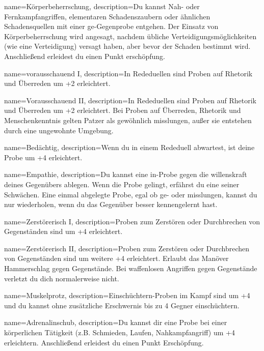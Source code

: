 {
    name={Körperbeherrschung},
    description={Du kannst Nah- oder Fernkampfangriffen, elementaren Schadenszaubern oder ähnlichen Schadensquellen mit einer \gls{ge}-Gegenprobe entgehen. Der Einsatz von Körperbeherrschung wird angesagt, nachdem übliche Verteidigungsmöglichkeiten (wie eine Verteidigung) versagt haben, aber bevor der Schaden bestimmt wird. Anschließend erleidest du einen Punkt \gls{erschöpfung}.}}

{
    name={vorausschauend I},
    description={In Rededuellen sind Proben auf Rhetorik und Überreden um +2 erleichtert.}}

{
    name={Vorausschauend II},
    description={In Rededuellen sind Proben auf Rhetorik und Überreden um +2 erleichtert. Bei Proben auf Überreden, Rhetorik und Menschenkenntnis gelten Patzer als gewöhnlich misslungen, außer sie entstehen durch eine ungewohnte Umgebung.}}

{
    name={Bedächtig},
    description={Wenn du in einem Rededuell abwartest, ist deine Probe um +4 erleichtert.}}

{
    name={Empathie},
    description={Du kannst eine \gls{in}-Probe gegen die \gls{willenskraft} deines Gegenübers ablegen. Wenn die Probe gelingt, erfährst du eine seiner Schwächen. Eine einmal abgelegte Probe, egal ob ge- oder misslungen, kannst du nur wiederholen, wenn du das Gegenüber besser kennengelernt hast.}}

{
    name={Zerstörerisch I},
    description={Proben zum Zerstören oder Durchbrechen von Gegenständen sind um +4 erleichtert.}}

{
    name={Zerstörerisch II},
    description={Proben zum Zerstören oder Durchbrechen von Gegenständen sind um weitere +4 erleichtert. Erlaubt das Manöver Hammerschlag gegen
Gegenstände. Bei waffenlosen Angriffen gegen Gegenstände verletzt du dich normalerweise nicht.}}

{
    name={Muskelprotz},
    description={Einschüchtern-Proben im Kampf sind um +4 und du kannst ohne zusätzliche Erschwernis bis zu 4 Gegner einschüchtern.}}

{
    name={Adrenalinschub},
    description={Du kannst dir eine Probe bei einer körperlichen Tätigkeit (z.B. Schmieden, Laufen, Nahkampfangriff) um +4 erleichtern. Anschließend erleidest du einen Punkt Erschöpfung.}}
        
